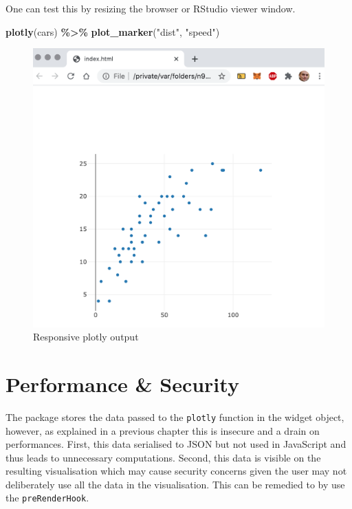 \documentclass[
]{krantz}
\makeatletter
\newenvironment{Shaded}{\begin{snugshade}}{\end{snugshade}}
\newcommand{\KeywordTok}[1]{\textcolor[rgb]{0.27,0.27,0.27}{\textbf{#1}}}
\newcommand{\NormalTok}[1]{#1}
\newcommand{\OperatorTok}[1]{\textcolor[rgb]{0.43,0.43,0.43}{\textbf{#1}}}
\newcommand{\StringTok}[1]{\textcolor[rgb]{0.5,0.5,0.5}{#1}}
\newenvironment{kframe}{%
\medskip{}
\setlength{\fboxsep}{.8em}
 \def\at@end@of@kframe{}%
 \ifinner\ifhmode%
  \def\at@end@of@kframe{\end{minipage}}%
  \begin{minipage}{\columnwidth}%
 \fi\fi%
 \def\FrameCommand##1{\hskip\@totalleftmargin \hskip-\fboxsep
 \colorbox{shadecolor}{##1}\hskip-\fboxsep
     \hskip-\linewidth \hskip-\@totalleftmargin \hskip\columnwidth}%
 \MakeFramed {\advance\hsize-\width
   \@totalleftmargin\z@ \linewidth\hsize
   \@setminipage}}%
 {\par\unskip\endMakeFramed%
 \at@end@of@kframe}
\renewenvironment{Shaded}{\begin{kframe}}{\end{kframe}}
\makeatother
\begin{document}
One can test this by resizing the browser or RStudio viewer window.

\begin{Shaded}
\begin{Highlighting}[]
\KeywordTok{plotly}\NormalTok{(cars) }\OperatorTok{\%>\%}\StringTok{  }
\StringTok{      }\KeywordTok{plot\_marker}\NormalTok{(}\StringTok{"dist"}\NormalTok{, }\StringTok{"speed"}\NormalTok{)}
\end{Highlighting}
\end{Shaded}

\begin{figure}
\centering
\includegraphics{images/plotlier-responsive.png}
\caption{Responsive plotly output}
\end{figure}

\hypertarget{performance-security}{%
\section{Performance \& Security}\label{performance-security}}

The package stores the data passed to the \texttt{plotly} function in the widget object, however, as explained in a previous chapter this is insecure and a drain on performances. First, this data serialised to JSON but not used in JavaScript and thus leads to unnecessary computations. Second, this data is visible on the resulting visualisation which may cause security concerns given the user may not deliberately use all the data in the visualisation. This can be remedied to by use the \texttt{preRenderHook}.
\end{document}
